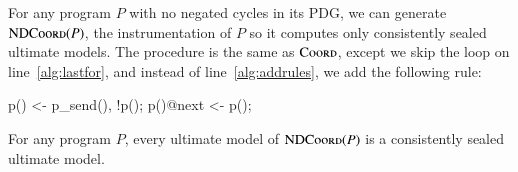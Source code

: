 For any \lang program $P$ with no negated cycles in its PDG, we can generate $\textsc{NDCoord}(P)$, the instrumentation of $P$ so it computes only consistently sealed ultimate models.  The procedure is the same as $\textsc{Coord}$, except we skip the loop on line~\ref{alg:lastfor}, and instead of line~\ref{alg:addrules}, we add the following rule:

\begin{Dedalus}
p() <- p_send(), !p(\dbar{_});
p()@next <- p();
\end{Dedalus}

\begin{theorem}
For any program $P$, every ultimate model of $\textsc{NDCoord}(P)$ is a consistently sealed ultimate model.
\end{theorem}

%
%
